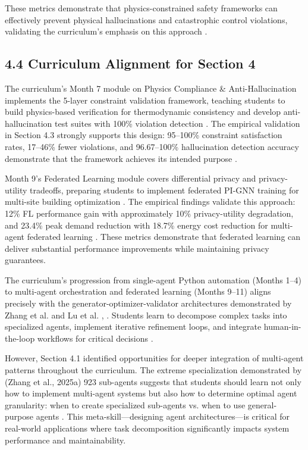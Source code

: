 \documentclass[12pt,a4paper]{article}
\begin{document}
These metrics demonstrate that physics-constrained safety frameworks can effectively prevent physical hallucinations and catastrophic control violations, validating the curriculum's emphasis on this approach \cite{ref222}.

\subsection{4.4 Curriculum Alignment for Section 4}

The curriculum's Month 7 module on Physics Compliance \& Anti-Hallucination implements the 5-layer constraint validation framework, teaching students to build physics-based verification for thermodynamic consistency and develop anti-hallucination test suites with 100\% violation detection \cite{ref223}. The empirical validation in Section 4.3 strongly supports this design: 95--100\% constraint satisfaction rates, 17--46\% fewer violations, and 96.67--100\% hallucination detection accuracy demonstrate that the framework achieves its intended purpose \cite{ref224}.

Month 9's Federated Learning module covers differential privacy and privacy-utility tradeoffs, preparing students to implement federated PI-GNN training for multi-site building optimization \cite{ref225}. The empirical findings validate this approach: 12\% FL performance gain with approximately 10\% privacy-utility degradation, and 23.4\% peak demand reduction with 18.7\% energy cost reduction for multi-agent federated learning \cite{ref226}. These metrics demonstrate that federated learning can deliver substantial performance improvements while maintaining privacy guarantees.

The curriculum's progression from single-agent Python automation (Months 1--4) to multi-agent orchestration and federated learning (Months 9--11) aligns precisely with the generator-optimizer-validator architectures demonstrated by Zhang et al. and Lu et al. \cite{ref227}, \cite{ref228}. Students learn to decompose complex tasks into specialized agents, implement iterative refinement loops, and integrate human-in-the-loop workflows for critical decisions \cite{ref229}.

However, Section 4.1 identified opportunities for deeper integration of multi-agent patterns throughout the curriculum. The extreme specialization demonstrated by (Zhang et al., 2025a) 923 sub-agents suggests that students should learn not only how to implement multi-agent systems but also how to determine optimal agent granularity: when to create specialized sub-agents vs. when to use general-purpose agents \cite{ref230}. This meta-skill---designing agent architectures---is critical for real-world applications where task decomposition significantly impacts system performance and maintainability.
\end{document}
